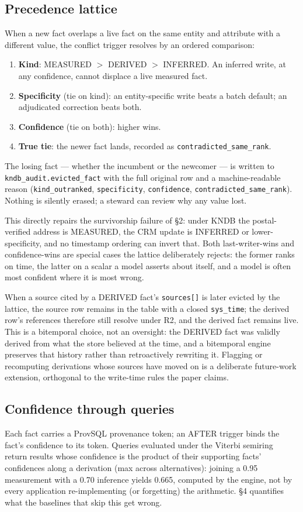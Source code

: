\documentclass[sigconf,nonacm]{acmart}
\begin{document}
\subsection{Precedence lattice}
When a new fact overlaps a live fact on the same entity and attribute with a different value, the conflict trigger resolves by an ordered comparison:
\begin{enumerate}
\item \textbf{Kind}: MEASURED $>$ DERIVED $>$ INFERRED. An inferred write, at any confidence, cannot displace a live measured fact.
\item \textbf{Specificity} (tie on kind): an entity-specific write beats a batch default; an adjudicated correction beats both.
\item \textbf{Confidence} (tie on both): higher wins.
\item \textbf{True tie}: the newer fact lands, recorded as \texttt{contradicted\_\allowbreak same\_\allowbreak rank}.
\end{enumerate}
The losing fact --- whether the incumbent or the newcomer --- is written to \texttt{kndb\_audit.evicted\_fact} with the full original row and a machine-readable reason (\texttt{kind\_outranked}, \texttt{specificity}, \texttt{confidence}, \texttt{contradicted\_same\_rank}). Nothing is silently erased; a steward can review why any value lost.

This directly repairs the survivorship failure of \S2: under KNDB the postal-verified address is MEASURED, the CRM update is INFERRED or lower-specificity, and no timestamp ordering can invert that. Both last-writer-wins and confidence-wins are special cases the lattice deliberately rejects: the former ranks on time, the latter on a scalar a model asserts about itself, and a model is often most confident where it is most wrong.

When a source cited by a DERIVED fact's \texttt{sources[]} is later evicted by the lattice, the source row remains in the table with a closed \texttt{sys\_time}; the derived row's references therefore still resolve under R2, and the derived fact remains live. This is a bitemporal choice, not an oversight: the DERIVED fact was validly derived from what the store believed at the time, and a bitemporal engine preserves that history rather than retroactively rewriting it. Flagging or recomputing derivations whose sources have moved on is a deliberate future-work extension, orthogonal to the write-time rules the paper claims.

\subsection{Confidence through queries}
Each fact carries a ProvSQL provenance token; an AFTER trigger binds the fact's confidence to its token. Queries evaluated under the Viterbi semiring~\cite{provsql,green} return results whose confidence is the product of their supporting facts' confidences along a derivation (max across alternatives): joining a 0.95 measurement with a 0.70 inference yields 0.665, computed by the engine, not by every application re-implementing (or forgetting) the arithmetic. \S4 quantifies what the baselines that skip this get wrong.
\end{document}
